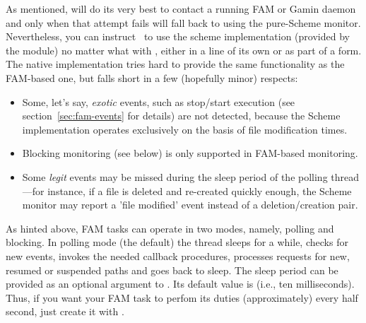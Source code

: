 As mentioned,  will do its very best to contact a
running FAM or Gamin daemon and only when that attempt fails will fall
back to using the pure-Scheme monitor. Nevertheless, you can instruct
\MzFam\ to use the scheme implementation (provided by the 
module) no matter what with , either in a
line of its own or as part of a  form. The native
implementation tries hard to provide the same functionality as the
FAM-based one, but falls short in a few (hopefully
minor)
respects:
\begin{itemize}
\item Some, let's say, \textit{exotic} events, such as stop/start
  execution (see section~\ref{sec:fam-events} for details) are not
  detected, because the Scheme implementation operates exclusively on
  the basis of file modification times.
\item Blocking monitoring (see below) is only supported in FAM-based
  monitoring.
\item Some \textit{legit} events may be missed during the sleep period
  of the polling thread---for instance, if a file is deleted and
  re-created quickly enough, the Scheme monitor may report a 'file
  modified' event instead of a deletion/creation pair.
\end{itemize}

As hinted above, FAM tasks can operate in two modes, namely, polling
and blocking. In polling mode (the default) the thread sleeps for a
while, checks for new events, invokes the needed callback procedures,
processes requests for new, resumed or suspended paths and goes back
to sleep. The sleep period can be provided as an optional argument to
. Its default value is  (i.e., ten
milliseconds). Thus, if you want your FAM task to perfom its duties
(approximately) every half second, just create it with
.


